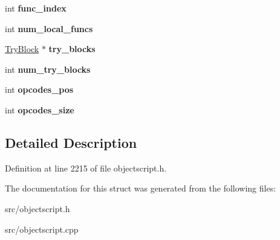 \begin{DoxyCompactItemize}
\item 
int {\bfseries func\+\_\+index}\hypertarget{struct_object_script_1_1_o_s_1_1_core_1_1_function_decl_a365aa28a330a1460aa2e99c238e91ed8}{}\label{struct_object_script_1_1_o_s_1_1_core_1_1_function_decl_a365aa28a330a1460aa2e99c238e91ed8}

\item 
int {\bfseries num\+\_\+local\+\_\+funcs}\hypertarget{struct_object_script_1_1_o_s_1_1_core_1_1_function_decl_a27d21939f609f420f4dac98fd729b5e6}{}\label{struct_object_script_1_1_o_s_1_1_core_1_1_function_decl_a27d21939f609f420f4dac98fd729b5e6}

\item 
\hyperlink{struct_object_script_1_1_o_s_1_1_core_1_1_function_decl_1_1_try_block}{Try\+Block} $\ast$ {\bfseries try\+\_\+blocks}\hypertarget{struct_object_script_1_1_o_s_1_1_core_1_1_function_decl_a85c0ff204d51aadc72d41fb96276d970}{}\label{struct_object_script_1_1_o_s_1_1_core_1_1_function_decl_a85c0ff204d51aadc72d41fb96276d970}

\item 
int {\bfseries num\+\_\+try\+\_\+blocks}\hypertarget{struct_object_script_1_1_o_s_1_1_core_1_1_function_decl_a173cbb8e442a79f35124e73d66553e36}{}\label{struct_object_script_1_1_o_s_1_1_core_1_1_function_decl_a173cbb8e442a79f35124e73d66553e36}

\item 
int {\bfseries opcodes\+\_\+pos}\hypertarget{struct_object_script_1_1_o_s_1_1_core_1_1_function_decl_a941c37056f869c8a8c996f0a788f5ced}{}\label{struct_object_script_1_1_o_s_1_1_core_1_1_function_decl_a941c37056f869c8a8c996f0a788f5ced}

\item 
int {\bfseries opcodes\+\_\+size}\hypertarget{struct_object_script_1_1_o_s_1_1_core_1_1_function_decl_a3093ce5591afecb9b686a28d8ba8ca1b}{}\label{struct_object_script_1_1_o_s_1_1_core_1_1_function_decl_a3093ce5591afecb9b686a28d8ba8ca1b}

\end{DoxyCompactItemize}


\subsection{Detailed Description}


Definition at line 2215 of file objectscript.\+h.



The documentation for this struct was generated from the following files\+:\begin{DoxyCompactItemize}
\item 
src/objectscript.\+h\item 
src/objectscript.\+cpp\end{DoxyCompactItemize}
